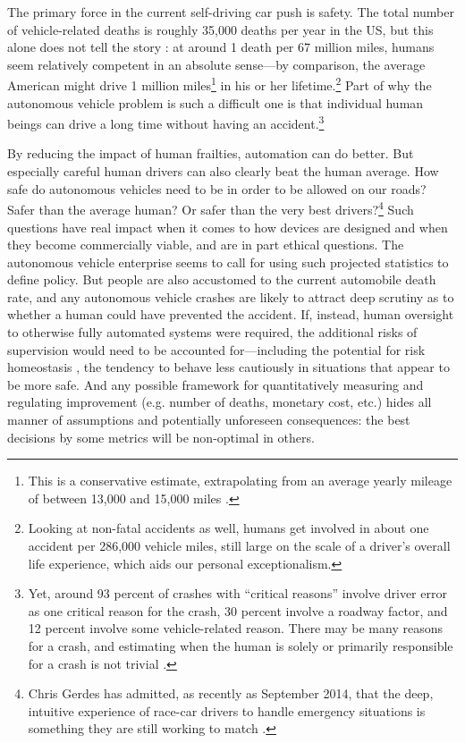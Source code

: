 The primary force in the current self-driving car
push is safety. The total number of vehicle-related deaths is 
roughly 35,000 deaths per year in the US, but this alone 
does not tell the story \cite{censusDeaths}: at around 1 death per 67
million miles, humans seem relatively 
competent in an absolute sense---by comparison, the average American might
drive 1 million miles\footnote{This is a conservative estimate,
  extrapolating from an average yearly mileage of between 13,000 and
  15,000 miles \cite{fhwa}.} in his or her lifetime.\footnote{Looking at non-fatal
accidents as well, humans get involved in about one accident per
286,000 vehicle miles, still large on the scale of a driver's overall
life experience, which aids our personal exceptionalism.} Part of why
the autonomous vehicle problem is 
such a difficult one is that individual human beings can drive a long
time without having an accident.\footnote{Yet, around 93 percent of crashes with ``critical
  reasons'' involve driver error as one critical reason for the crash, 30 percent involve a roadway factor, and 12 percent involve some
vehicle-related reason. There may be many reasons for a crash, and
estimating when the human is solely or primarily responsible for a
crash is not trivial \cite{NHTSAcrash}.}


By reducing the impact of human
frailties, automation can do better. But especially careful human
drivers can also clearly beat the human average. How safe do
autonomous vehicles need to be in order to be allowed on our roads?
Safer than the average human? Or safer than the very best
drivers?\footnote{Chris Gerdes has admitted, as recently as September
  2014, that the deep, intuitive experience of race-car drivers to
  handle emergency situations is something they are still working to
  match \cite{8truthsandmyths}.}
Such questions have real impact when it comes to how devices are
designed and when they become commercially viable, and are in
part ethical questions. The autonomous
vehicle enterprise seems to call for using such projected statistics
to define policy. But
people are also accustomed to the current automobile death rate, and
any autonomous vehicle crashes are likely to attract deep
scrutiny as
to whether a human could have prevented the accident. If,
instead, human oversight to otherwise fully automated systems were
required, the additional risks of supervision would need to be
accounted for---including the potential for risk homeostasis
\cite{Wilde}, the tendency to
behave less cautiously in situations that appear to be more safe. And
any possible framework for 
  quantitatively measuring and regulating improvement (e.g. number of deaths,
  monetary cost, etc.) hides all manner of assumptions and 
  potentially unforeseen consequences: the best decisions by some
  metrics will be non-optimal in others. 


